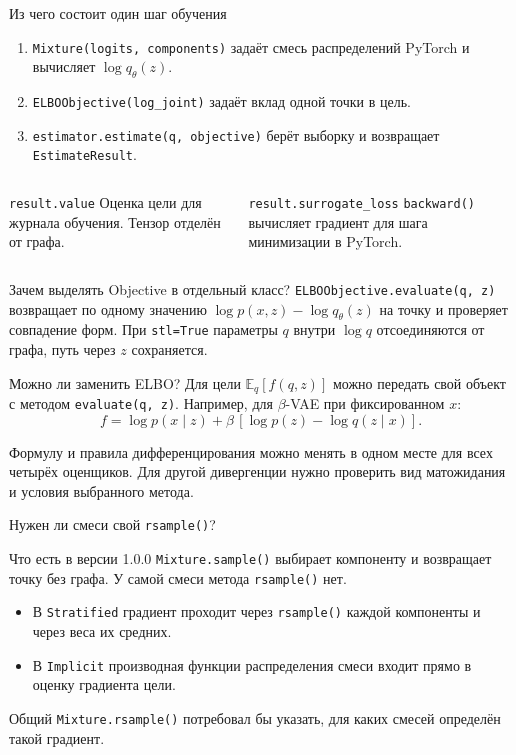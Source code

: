 \documentclass[aspectratio=169]{beamer}
\begin{document}
\begin{frame}{Из чего состоит один шаг обучения}
\begin{enumerate}
\item \texttt{Mixture(logits, components)} задаёт смесь распределений PyTorch и вычисляет $\log q_\theta(z)$.
\item \texttt{ELBOObjective(log\_joint)} задаёт вклад одной точки в цель.
\item \texttt{estimator.estimate(q, objective)} берёт выборку и возвращает \texttt{EstimateResult}.
\end{enumerate}
\begin{columns}[T,onlytextwidth]
\begin{block}{\texttt{result.value}}
Оценка цели для журнала обучения. Тензор отделён от графа.
\end{block}
\begin{block}{\texttt{result.surrogate\_loss}}
\texttt{backward()} вычисляет градиент для шага минимизации в PyTorch.
\end{block}
\end{columns}
\end{frame}

\begin{frame}{Зачем выделять Objective в отдельный класс?}
\texttt{ELBOObjective.evaluate(q, z)} возвращает по одному значению
$\log p(x,z)-\log q_\theta(z)$ на точку и проверяет совпадение форм.
При \texttt{stl=True} параметры $q$ внутри $\log q$ отсоединяются от графа, путь через $z$ сохраняется.
\begin{block}{Можно ли заменить ELBO?}
Для цели $\mathbb E_q[f(q,z)]$ можно передать свой объект с методом \texttt{evaluate(q, z)}. Например, для $\beta$-VAE при фиксированном $x$:
\[
 f=\log p(x\mid z)+\beta\,[\log p(z)-\log q(z\mid x)].
\]
\end{block}
Формулу и правила дифференцирования можно менять в одном месте для всех четырёх оценщиков. Для другой дивергенции нужно проверить вид матожидания и условия выбранного метода.
\end{frame}

\begin{frame}{Нужен ли смеси свой \texttt{rsample()}?}
\begin{block}{Что есть в версии 1.0.0}
\texttt{Mixture.sample()} выбирает компоненту и возвращает точку без графа. У самой смеси метода \texttt{rsample()} нет.
\end{block}
\begin{itemize}
\item В \texttt{Stratified} градиент проходит через \texttt{rsample()} каждой компоненты и через веса их средних.
\item В \texttt{Implicit} производная функции распределения смеси входит прямо в оценку градиента цели.
\end{itemize}
Общий \texttt{Mixture.rsample()} потребовал бы указать, для каких смесей определён такой градиент.
\end{frame}
\end{document}
